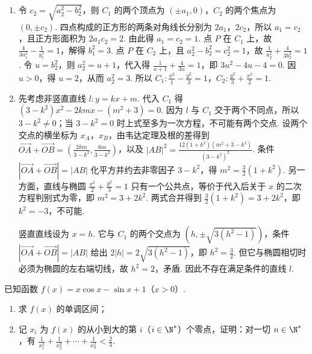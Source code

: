 \begin{solution}
\begin{enumerate}
\item 令 \(c_2=\sqrt{a_2^2-b_2^2}\)，则 \(C_1\) 的两个顶点为 \((\pm a_1,0)\)，\(C_2\) 的两个焦点为 \((0,\pm c_2)\). 四点构成的正方形的两条对角线长分别为 \(2a_1\)，\(2c_2\)，所以 \(a_1=c_2\)，且正方形面积为 \(2a_1c_2=2\). 由此得 \(a_1=c_2=1\). 点 \(P\) 在 \(C_1\) 上，故 \(\frac{4}{3a_1^2}-\frac1{b_1^2}=1\)，解得 \(b_1^2=3\). 点 \(P\) 在 \(C_2\) 上，且 \(a_2^2-b_2^2=c_2^2=1\)，故 \(\frac1{a_2^2}+\frac{4}{3b_2^2}=1\). 令 \(u=b_2^2\)，则 \(a_2^2=u+1\)，代入得 \(\frac1{u+1}+\frac4{3u}=1\)，即 \(3u^2-4u-4=0\). 因 \(u>0\)，得 \(u=2\)，从而 \(a_2^2=3\). 所以 \(C_1:\frac{x^2}{1}-\frac{y^2}{3}=1\)，\(C_2:\frac{y^2}{3}+\frac{x^2}{2}=1\).
\item 先考虑非竖直直线 \(l:y=kx+m\). 代入 \(C_1\) 得 \((3-k^2)x^2-2kmx-(m^2+3)=0\). 因为 \(l\) 与 \(C_1\) 交于两个不同点，所以 \(3-k^2\ne0\)；当 \(3-k^2=0\) 时上式至多为一次方程，不可能有两个交点. 设两个交点的横坐标为 \(x_A\)，\(x_B\)，由韦达定理及根的差得到 \(\overrightarrow{OA}+\overrightarrow{OB}=\left(\frac{2km}{3-k^2},\frac{6m}{3-k^2}\right)\)，以及 \(|AB|^2=\frac{12(1+k^2)(m^2+3-k^2)}{(3-k^2)^2}\). 条件 \(|\overrightarrow{OA}+\overrightarrow{OB}|=|AB|\) 化平方并约去非零因子 \(3-k^2\)，得 \(m^2=\frac32(1+k^2)\). 另一方面，直线与椭圆 \(\frac{x^2}{2}+\frac{y^2}{3}=1\) 只有一个公共点，等价于代入后关于 \(x\) 的二次方程判别式为零，即 \(m^2=3+2k^2\). 两式合并得到 \(\frac32(1+k^2)=3+2k^2\)，即 \(k^2=-3\)，不可能.

竖直直线设为 \(x=h\). 它与 \(C_1\) 的两个交点为 \((h,\pm\sqrt{3(h^2-1)})\)，条件 \(|\overrightarrow{OA}+\overrightarrow{OB}|=|AB|\) 给出 \(2|h|=2\sqrt{3(h^2-1)}\)，即 \(h^2=\frac{3}{2}\). 但它与椭圆相切时必须为椭圆的左右端切线，故 \(h^2=2\)，矛盾. 因此不存在满足条件的直线 \(l\).
\end{enumerate}
\end{solution}

\begin{problem}
已知函数 \( f(x) = x \cos x - \sin x + 1\)（\(x > 0\)）.

\begin{enumerate}
\item 求 \( f(x) \) 的单调区间；
\item 记 \(x_{i}\) 为 \(f(x)\) 的从小到大的第 \(i\)（\(i \in \N^{*}\)）个零点，证明：对一切 \(n \in \N^{*}\)，有 \(\frac{1}{x_1^2} + \frac{1}{x_2^2} + \cdots + \frac{1}{x_n^2} < \frac{2}{3}\).
\end{enumerate}
\end{problem}


